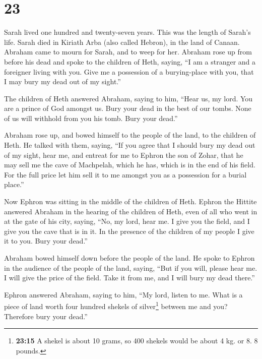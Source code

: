 \hypertarget{section-22}{%
\section{23}\label{section-22}}

 Sarah lived one hundred and twenty-seven years. This was
the length of Sarah's life.  Sarah died in Kiriath Arba
(also called Hebron), in the land of Canaan. Abraham came to mourn for
Sarah, and to weep for her.  Abraham rose up from before
his dead and spoke to the children of Heth, saying,  ``I
am a stranger and a foreigner living with you. Give me a possession of a
burying-place with you, that I may bury my dead out of my sight.''

 The children of Heth answered Abraham, saying to him,
 ``Hear us, my lord. You are a prince of God amongst us.
Bury your dead in the best of our tombs. None of us will withhold from
you his tomb. Bury your dead.''

 Abraham rose up, and bowed himself to the people of the
land, to the children of Heth.  He talked with them,
saying, ``If you agree that I should bury my dead out of my sight, hear
me, and entreat for me to Ephron the son of Zohar,  that
he may sell me the cave of Machpelah, which he has, which is in the end
of his field. For the full price let him sell it to me amongst you as a
possession for a burial place.''

 Now Ephron was sitting in the middle of the children of
Heth. Ephron the Hittite answered Abraham in the hearing of the children
of Heth, even of all who went in at the gate of his city, saying,
 ``No, my lord, hear me. I give you the field, and I give
you the cave that is in it. In the presence of the children of my people
I give it to you. Bury your dead.''

 Abraham bowed himself down before the people of the
land.  He spoke to Ephron in the audience of the people
of the land, saying, ``But if you will, please hear me. I will give the
price of the field. Take it from me, and I will bury my dead there.''

 Ephron answered Abraham, saying to him, 
``My lord, listen to me. What is a piece of land worth four hundred
shekels of silver\footnote{\textbf{23:15} A shekel is about 10 grams, so
  400 shekels would be about 4 kg. or 8. 8 pounds.} between me and you?
Therefore bury your dead.''

